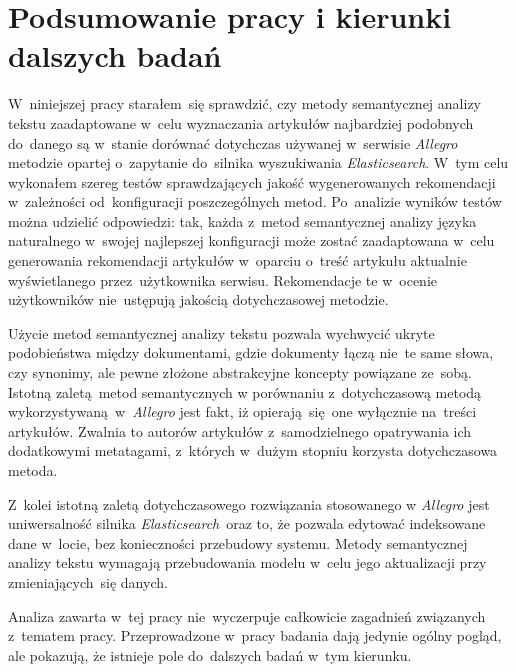 \documentclass[pl]{minipw} %
\begin{document}
\chapter{Podsumowanie pracy i kierunki dalszych badań}

W~niniejszej pracy starałem~się sprawdzić, czy metody semantycznej analizy tekstu zaadaptowane w~celu wyznaczania artykułów najbardziej podobnych do~danego są w~stanie dorównać dotychczas używanej w~serwisie \textit{Allegro} metodzie opartej o~zapytanie do~silnika wyszukiwania \textit{Elasticsearch}. W~tym celu wykonałem szereg testów sprawdzających jakość wygenerowanych rekomendacji w~zależności od~konfiguracji poszczególnych metod. Po~analizie wyników testów można udzielić odpowiedzi: tak, każda z~metod semantycznej analizy języka naturalnego w~swojej najlepszej konfiguracji może zostać zaadaptowana w~celu generowania rekomendacji artykułów w~oparciu o~treść artykułu aktualnie wyświetlanego przez~użytkownika serwisu. Rekomendacje te w~ocenie użytkowników nie~ustępują jakością dotychczasowej metodzie. 

Użycie metod semantycznej analizy tekstu pozwala wychwycić ukryte podobieństwa między dokumentami, gdzie dokumenty łączą nie~te same słowa, czy synonimy, ale pewne złożone abstrakcyjne koncepty powiązane ze~sobą. Istotną zaletą metod semantycznych w porównaniu z~dotychczasową metodą wykorzystywaną w~\textit{Allegro} jest fakt, iż opierają~się one wyłącznie na~treści artykułów. Zwalnia to autorów artykułów z~samodzielnego opatrywania ich dodatkowymi metatagami, z~których w~dużym stopniu korzysta dotychczasowa metoda.

Z~kolei istotną zaletą dotychczasowego rozwiązania stosowanego w \textit{Allegro} jest uniwersalność silnika \textit{Elasticsearch}~oraz to, że pozwala edytować indeksowane dane w~locie, bez konieczności przebudowy systemu. Metody semantycznej analizy tekstu wymagają przebudowania modelu w~celu jego aktualizacji przy zmieniających~się danych.

Analiza zawarta w~tej pracy nie~wyczerpuje całkowicie zagadnień związanych z~tematem pracy. Przeprowadzone w~pracy badania dają jedynie ogólny pogląd, ale pokazują, że istnieje pole do~dalszych badań w~tym kierunku.
\end{document}

